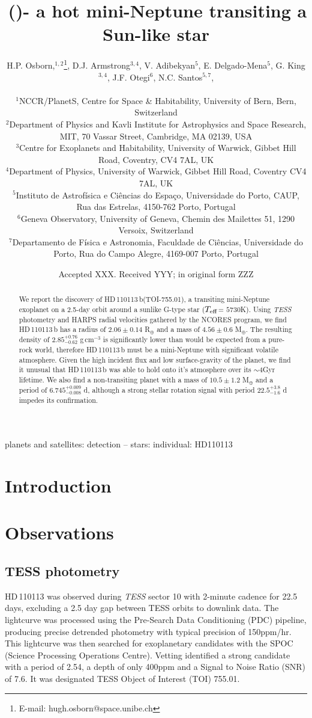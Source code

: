 \documentclass[fleqn,usenatbib]{mnras}
\title[\Tplanet]{\Tplanet\,(\TTplanet)- a hot mini-Neptune transiting a Sun-like star}
\author[H.P. Osborn et al.]{
\parbox{\textwidth}{H.P. Osborn,$^{{1},{2}}$\thanks{E-mail: hugh.osborn@space.unibe.ch},
D.J. Armstrong$^{3,4}$, %
V. Adibekyan$^{5}$, %
E. Delgado-Mena$^{5}$,
G. King$^{3,4}$, %
J.F. Otegi$^{6}$, %
N.C. Santos$^{5,7}$, %
}\\
$^{1}$NCCR/PlanetS, Centre for Space \& Habitability, University of Bern, Bern, Switzerland\\
$^{2}$Department of Physics and Kavli Institute for Astrophysics and Space Research, MIT, 70 Vassar Street, Cambridge, MA 02139, USA\\
$^{3}$Centre for Exoplanets and Habitability, University of Warwick, Gibbet Hill Road, Coventry, CV4 7AL, UK\\
$^{4}$Department of Physics, University of Warwick, Gibbet Hill Road, Coventry CV4 7AL, UK \\
$^{5}$Instituto de Astrof\'isica e Ci\^encias do Espa\c{c}o, Universidade do Porto, CAUP, Rua das Estrelas, 4150-762 Porto, Portugal\\
$^{6}$Geneva Observatory, University of Geneva, Chemin des Mailettes 51, 1290 Versoix, Switzerland\\
$^{7}$Departamento de F\'isica e Astronomia, Faculdade de Ci\^{e}ncias, Universidade do Porto, Rua do Campo Alegre, 4169-007 Porto, Portugal\\
}
\date{Accepted XXX. Received YYY; in original form ZZZ}
\newcommand{\gcm}{g\,cm$^{-3}$}	%
\newcommand{\tess}{{\it TESS}}
\newcommand{\harps}{{HARPS}}
\newcommand{\rearth}{R$_{\oplus}$}
\newcommand{\mearth}{M$_{\oplus}$}
\newcommand{\teff}{$T_{\rm eff}$}
\newcommand{\TPone}{ $ 6.745^{+0.009}_{-0.008} $ }
\newcommand{\TMpzero}{ $ 4.56 \pm 0.6 $ }
\newcommand{\TMpone}{ $ 10.5 \pm 1.2 $ }
\newcommand{\Trplzero}{ $ 2.06 \pm 0.14 $ }
\newcommand{\Trhopgcmthreezero}{ $ 2.85^{+0.76}_{-0.62} $ }
\newcommand{\Tperiod}{ $ 22.5^{+3.8}_{-1.6} $ }
\newcommand{\TTplanet}{TOI-755.01}
\newcommand{\Tstar}{HD\,110113}
\newcommand{\Tplanet}{HD\,110113\,b}
\begin{document}
\label{firstpage}
\pagerange{\pageref{firstpage}--\pageref{lastpage}}
\maketitle

\begin{abstract}
We report the discovery of \Tplanet{}(\TTplanet{}), a transiting mini-Neptune exoplanet on a 2.5-day orbit around a sunlike G-type star (\teff{}= $5730$K).
Using \tess{} photometry and \harps{} radial velocities gathered by the NCORES program, we find \Tplanet{} has a radius of \Trplzero{}\rearth{} and a mass of \TMpzero{} \mearth{}.
The resulting density of \Trhopgcmthreezero{}\gcm{} is significantly lower than would be expected from a pure-rock world, therefore \Tplanet{} must be a mini-Neptune with significant volatile atmosphere.
Given the high incident flux and low surface-gravity of the planet, we find it unusual that \Tplanet{} was able to hold onto it's atmosphere over its $\sim4$Gyr lifetime.
We also find a non-transiting planet with a mass of \TMpone{} \mearth{} and a period of \TPone{}d, although a strong stellar rotation signal with period \Tperiod{}d impedes its confirmation.
\end{abstract}

\begin{keywords}
planets and satellites: detection -- stars: individual: HD110113
\end{keywords}



\section{Introduction}


\section{Observations}

\subsection{TESS photometry}
\Tstar{} was observed during \tess{} sector 10 with 2-minute cadence for 22.5 days, excluding a 2.5 day gap between TESS orbits to downlink data.
The lightcurve was processed using the Pre-Search Data Conditioning (PDC) pipeline, producing precise detrended photometry with typical precision of 150ppm/hr.
This lightcurve was then searched for exoplanetary candidates with the SPOC (Science Processing Operations Centre).
Vetting identified a strong candidate with a period of 2.54, a depth of only 400ppm and a Signal to Noise Ratio (SNR) of 7.6.
It was designated TESS Object of Interest (TOI) 755.01. 
\end{document}
